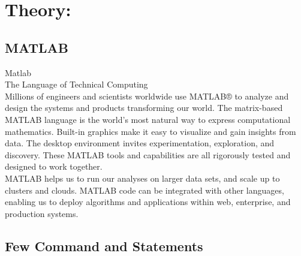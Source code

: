 \documentclass[12pt]{article}
\begin{document}

\tableofcontents
\pagebreak


\section{Theory:}
\subsection{MATLAB}
Matlab \\The Language of Technical Computing\\
Millions of engineers and scientists worldwide use MATLAB® to analyze and design the systems and products transforming our world. The matrix-based MATLAB language is the world's most natural way to express computational mathematics. Built-in graphics make it easy to visualize and gain insights from data. The desktop environment invites experimentation, exploration, and discovery. These MATLAB tools and capabilities are all rigorously tested and designed to work together.\\

MATLAB helps us to run our analyses on larger data sets, and scale up to clusters and clouds. MATLAB code can be integrated with other languages, enabling us to deploy algorithms and applications within web, enterprise, and production systems.\\


\subsection{Few Command and Statements}
\end{document}
